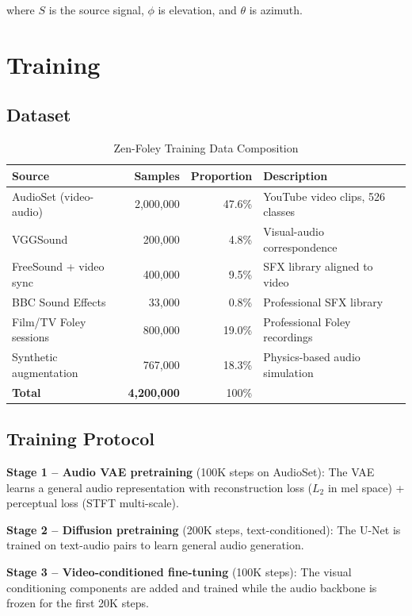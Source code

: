 \documentclass[11pt,a4paper]{article}
\begin{document}
where $S$ is the source signal, $\phi$ is elevation, and $\theta$ is azimuth.

\section{Training}

\subsection{Dataset}

\begin{table}[H]
\centering
\begin{tabular}{lrrl}
\toprule
\textbf{Source} & \textbf{Samples} & \textbf{Proportion} & \textbf{Description} \\
\midrule
AudioSet (video-audio) & 2,000,000 & 47.6\% & YouTube video clips, 526 classes \\
VGGSound & 200,000 & 4.8\% & Visual-audio correspondence \\
FreeSound + video sync & 400,000 & 9.5\% & SFX library aligned to video \\
BBC Sound Effects & 33,000 & 0.8\% & Professional SFX library \\
Film/TV Foley sessions & 800,000 & 19.0\% & Professional Foley recordings \\
Synthetic augmentation & 767,000 & 18.3\% & Physics-based audio simulation \\
\midrule
\textbf{Total} & \textbf{4,200,000} & 100\% & \\
\bottomrule
\end{tabular}
\caption{Zen-Foley Training Data Composition}
\end{table}

\subsection{Training Protocol}

\textbf{Stage 1 -- Audio VAE pretraining} (100K steps on AudioSet): The VAE learns a general
audio representation with reconstruction loss ($L_2$ in mel space) + perceptual loss
(STFT multi-scale).

\textbf{Stage 2 -- Diffusion pretraining} (200K steps, text-conditioned): The U-Net is
trained on text-audio pairs to learn general audio generation.

\textbf{Stage 3 -- Video-conditioned fine-tuning} (100K steps): The visual conditioning
components are added and trained while the audio backbone is frozen for the first 20K steps.
\end{document}
